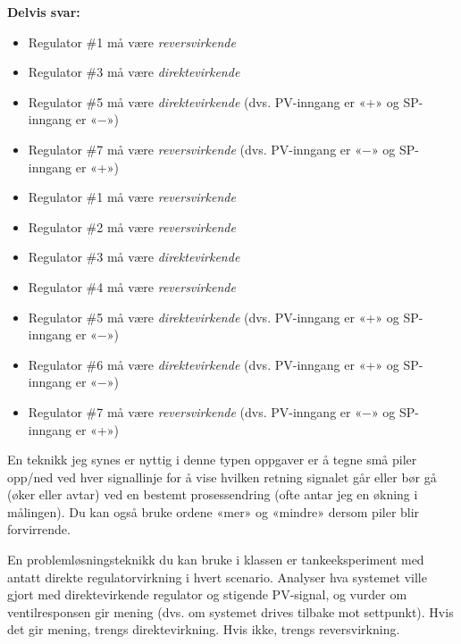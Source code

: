 





\noindent
{\bf Delvis svar:}

\begin{itemize}
\item{} Regulator \#1 må være {\it reversvirkende}
\item{} Regulator \#3 må være {\it direktevirkende}
\item{} Regulator \#5 må være {\it direktevirkende} (dvs. PV-inngang er «+» og SP-inngang er «$-$»)
\item{} Regulator \#7 må være {\it reversvirkende} (dvs. PV-inngang er «$-$» og SP-inngang er «+»)
\end{itemize}







\begin{itemize}
\item{} Regulator \#1 må være {\it reversvirkende}
\item{} Regulator \#2 må være {\it reversvirkende}
\item{} Regulator \#3 må være {\it direktevirkende}
\item{} Regulator \#4 må være {\it reversvirkende}
\item{} Regulator \#5 må være {\it direktevirkende} (dvs. PV-inngang er «+» og SP-inngang er «$-$»)
\item{} Regulator \#6 må være {\it direktevirkende} (dvs. PV-inngang er «+» og SP-inngang er «$-$»)
\item{} Regulator \#7 må være {\it reversvirkende} (dvs. PV-inngang er «$-$» og SP-inngang er «+»)
\end{itemize}

\vskip 10pt

En teknikk jeg synes er nyttig i denne typen oppgaver er å tegne små piler opp/ned ved hver signallinje for å vise hvilken retning signalet går eller bør gå (øker eller avtar) ved en bestemt prosessendring (ofte antar jeg en økning i målingen). Du kan også bruke ordene «mer» og «mindre» dersom piler blir forvirrende.

\vskip 10pt

En problemløsningsteknikk du kan bruke i klassen er tankeeksperiment med antatt direkte regulatorvirkning i hvert scenario. Analyser hva systemet ville gjort med direktevirkende regulator og stigende PV-signal, og vurder om ventilresponsen gir mening (dvs. om systemet drives tilbake mot settpunkt). Hvis det gir mening, trengs direktevirkning. Hvis ikke, trengs reversvirkning.

